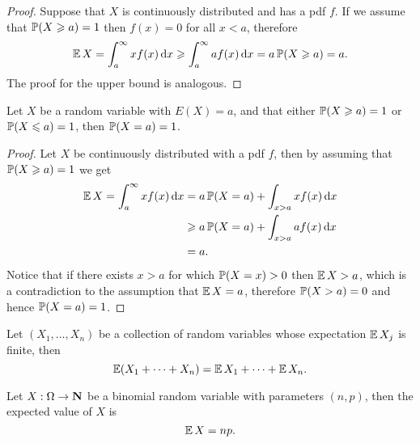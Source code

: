 \begin{proof}
    Suppose that \(X\) is continuously distributed and has a pdf \(f\). If we assume
    that \(\operatorname{\mathbb{P}}(X \geqslant a) = 1\) then \(f(x) = 0\) for all \(x < a\), therefore
    \[
        \operatorname{\mathbb{E}} X = \int_a^{\infty} x f(x)\, \mathrm{d} x
        \geqslant \int_a^{\infty} a f(x)\, \mathrm{d} x
        = a \operatorname{\mathbb{P}}(X \geqslant a) = a.
    \]
    The proof for the upper bound is analogous.
\end{proof}

\begin{proposition}
    \label{prop:expectation-bound-prob-1}
    Let \(X\) be a random variable with \(E(X) = a\), and that either \(\operatorname{\mathbb{P}}(X \geqslant a)
    = 1\) or \(\operatorname{\mathbb{P}}(X \leqslant a) = 1\), then \(\operatorname{\mathbb{P}}(X = a) = 1\).
\end{proposition}

\begin{proof}
    Let \(X\) be continuously distributed with a pdf \(f\), then by assuming that
    \(\operatorname{\mathbb{P}}(X \geqslant a) = 1\) we get
    \begin{align*}
        \operatorname{\mathbb{E}} X = \int_a^{\infty} x f(x)\, \mathrm{d} x
         & = a \operatorname{\mathbb{P}}(X = a) + \int_{x > a} x f(x)\, \mathrm{d} x    \\
         & \geqslant a \operatorname{\mathbb{P}}(X = a) + \int_{x > a} a f(x)\, \mathrm{d} x \\
         & = a.
    \end{align*}
    Notice that if there exists \(x > a\) for which \(\operatorname{\mathbb{P}}(X = x) > 0\) then
    \(\operatorname{\mathbb{E}} X > a\), which is a contradiction to the assumption that \(\operatorname{\mathbb{E}} X
    = a\), therefore \(\operatorname{\mathbb{P}}(X > a) = 0\) and hence \(\operatorname{\mathbb{P}}(X = a) = 1\).
\end{proof}

\begin{proposition}
    \label{prop:additivity-expected-value}
    Let \((X_1, \dots, X_n)\) be a collection of random variables whose expectation
    \(\operatorname{\mathbb{E}} X_j\) is finite, then
    \[
        \operatorname{\mathbb{E}}(X_1 + \dots + X_n) = \operatorname{\mathbb{E}} X_1 + \dots + \operatorname{\mathbb{E}} X_n.
    \]
\end{proposition}

\begin{proposition}
    \label{prop:mean-of-binomial-random-variable}
    Let \(X: \Omega \to \mathbf{N}\) be a binomial random variable with parameters
    \((n, p)\), then the expected value of \(X\) is
    \[
        \operatorname{\mathbb{E}} X = n p.
    \]
\end{proposition}

